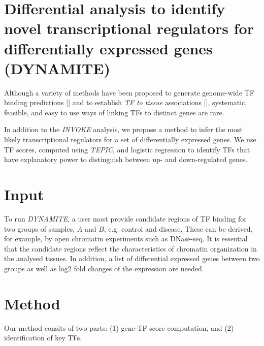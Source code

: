 \documentclass{article}
\begin{document}
\newpage
\mbox{}
\newpage
\section*{Differential analysis to identify novel transcriptional regulators for differentially expressed genes (DYNAMITE)}
Although a variety of methods have been proposed to generate genome-wide TF binding predictions [\cite{pmid27899623,pmid22072382,pmid23424114,pmid25086003}] and to establish \textit{TF to tissue} 
associations [\cite{pmid22955983,pmid19995984,pmid27899623}], systematic, feasible, and easy to use ways of linking TFs to distinct genes are rare. 

In addition to the \textit{INVOKE} analysis, we propose a method to infer the most likely transcriptional regulators for a set of differentially expressed genes. 
We use TF scores, computed using \textit{TEPIC}, and logistic regression to identify TFs that have explanatory power to distinguish between up- and down-regulated genes. 

\section*{Input}
To run \textit{DYNAMITE}, a user most provide candidate regions of TF binding for two groups of samples, $A$ and $B$, e.g. control and disease. 
These can be derived, for example, by open chromatin experiments such as DNase-seq. 
It is essential that the candidate regions reflect the characteristics of chromatin organization in the analysed tissues. 
In addition, a list of differential expressed genes between two groups as well as log2 fold changes of the expression are needed. 

\section*{Method}
Our method consits of two parts: (1) gene-TF score computation, and (2) identification of key TFs. 
\end{document}
